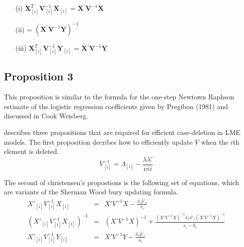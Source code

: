 \documentclass[Main.tex]{subfiles}
\begin{document}
\begin{itemize}
	\item[(i)] $ \boldsymbol{X}_{[i]}^{T}\boldsymbol{V}^{-1}_{[i]}\boldsymbol{X}_{[i]}$ = $\boldsymbol{X}^{\prime}\boldsymbol{V}^{-1}\boldsymbol{X}$
	\item[(ii)] = $(\boldsymbol{X}^{\prime}\boldsymbol{V}^{-1}\boldsymbol{Y})^{-1}$
	\item[(iii)] $ \boldsymbol{X}_{[i]}^{T}\boldsymbol{V}^{-1}_{[i]}\boldsymbol{Y}_{[i]}$ = $\boldsymbol{X}^{\prime}\boldsymbol{V}^{-1}\boldsymbol{Y}$
\end{itemize}
\subsection{Proposition 3}
This proposition is similar to the formula for the one-step Newtown Raphson estimate of the logistic regression coefficients given by Pregibon (1981) and discussed in Cook Weisberg.


\newpage
\citet{Christensen} describes three propositions that are required
for efficient case-deletion in LME models. The first proposition
decribes how to efficiently update $V$ when the $i$th element is
deleted.
\begin{equation}
V_{[i]}^{-1} = \Lambda_{[i]} - \frac{\lambda
	\lambda\prime}{\nu^{}ii}
\end{equation}


The second of christensen's propostions is the following set of
equations, which are variants of the Sherman Wood bury updating
formula.
\begin{eqnarray}
X'_{[i]}V_{[i]}^{-1}X_{[i]} &=& X' V^{-1}X -
\frac{\hat{x}_{i}\hat{x}'_{i}}{s_{i}}\\
(X'_{[i]}V_{[i]}^{-1}X_{[i]})^{-1} &=& (X' V^{-1}X)^{-1} +
\frac{(X' V^{-1}X)^{-1}\hat{x}_{i}\hat{x}' _{i}
	(X' V^{-1}X)^{-1}}{s_{i}- \bar{h}_{i}}\\
X'_{[i]}V_{[i]}^{-1}Y_{[i]} &=& X\prime V^{-1}Y -
\frac{\hat{x}_{i}\hat{y}' _{i}}{s_{i}}
\end{eqnarray}








\end{document}
